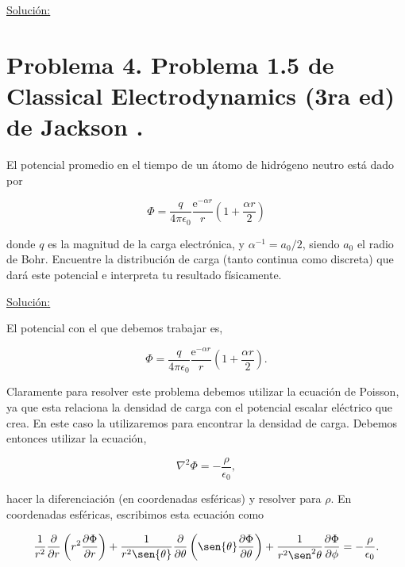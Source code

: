 \documentclass[a4paper,10pt]{article}
\numberwithin{equation}{section}
\newcommand{\euler}{\mathrm{e}}
\begin{document}
\vspace{.3cm}

\underline{Solución:} \vspace{.3cm}

\section{Problema 4. Problema 1.5 de Classical Electrodynamics (3ra ed) de 
Jackson \cite{jackson}.}

El potencial promedio en el tiempo de un átomo de hidrógeno neutro está dado por 

$$
\Phi = \frac{q}{4\pi\epsilon_0}\frac{\euler^{-\alpha r}}{r}\left(1 + 
\frac{\alpha r}{2}\right)
$$

donde $q$ es la magnitud de la carga electrónica, y $\alpha^{-1} = a_0/2$, siendo 
$a_0$ el radio de Bohr. Encuentre la distribución de carga (tanto continua como 
discreta) que dará este potencial e interpreta tu resultado físicamente.

\vspace{.3cm}

\underline{Solución:} \vspace{.3cm}

El potencial con el que debemos trabajar es, 

\begin{equation}
 \Phi = \frac{q}{4\pi\epsilon_0}\frac{\euler^{-\alpha r}}{r}\left(1 + 
\frac{\alpha r}{2}\right).
\label{eq:potencialhidrogeno}
\end{equation}

Claramente para resolver este problema debemos utilizar la ecuación de Poisson, ya 
que esta relaciona la densidad de carga con el potencial escalar eléctrico que 
crea. En este caso la utilizaremos para encontrar la densidad de carga. Debemos entonces 
utilizar la ecuación, 

\begin{equation}
 \nabla^2 \Phi = - \frac{\rho}{\epsilon_0},
\end{equation}

hacer la diferenciación (en coordenadas esféricas) y resolver para $\rho$. En coordenadas 
esféricas, escribimos esta ecuación como 

\begin{equation}
 \frac{1}{r^2}\frac{\partial}{\partial r}\left(r^2\frac{\partial \Phi}{\partial r}\right) +
 \frac{1}{r^2\sen{\theta}}\frac{\partial}{\partial \theta}
 \left(\sen{\theta}\frac{\partial \Phi}{\partial \theta} \right) + 
 \frac{1}{r^2\sen^2{\theta}}\frac{\partial \Phi}{\partial \phi} = 
 - \frac{\rho}{\epsilon_0}.
 \label{eq:nablaesferica}
\end{equation}
\end{document}
